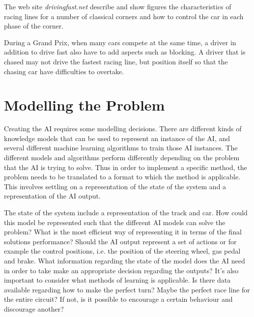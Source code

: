 The web site \textit{drivingfast.net} describe and show figures the characteristics of racing lines for a number of classical corners and how to control the car in each phase of the corner\cite{driving_fast_racing_line}\cite{driving_fast_corners}.

During a Grand Prix, when many cars compete at the same time, a driver in addition to drive fast also have to add aspects such as blocking. A driver that is chased may not drive the fastest racing line, but position itself so that the chasing car have difficulties to overtake.

\section{Modelling the Problem}
Creating the AI requires some modelling decisions. There are different kinds of knowledge models that can be used to represent an instance of the AI, and several different machine learning algorithms to train those AI instances. The different models and algorithms perform differently depending on the problem that the AI is trying to solve. Thus in order to implement a specific method, the problem needs to be translated to a format to which the method is applicable. This involves settling on a representation of the state of the system and a representation of the AI output.

The state of the system include a representation of the track and car. How could this model be represented such that the different AI models can solve the problem? What is the most efficient way of representing it in terms of the final solutions performance? Should the AI output represent a set of actions or for example the control positions, i.e. the position of the steering wheel, gas pedal and brake. What information regarding the state of the model does the AI need in order to take make an appropriate decision regarding the outputs? It's also important to consider what methods of learning is applicable. Is there data available regarding how to make the perfect turn? Maybe the perfect race line for the entire circuit? If not, is it possible to encourage a certain behaviour and discourage another?

